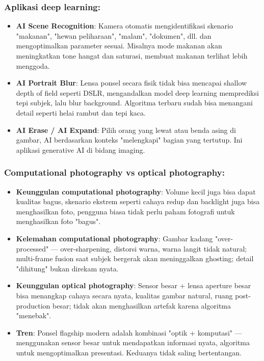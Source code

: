 \subsubsection*{Aplikasi deep learning:}

\begin{itemize}
  \item \textbf{AI Scene Recognition}: Kamera otomatis mengidentifikasi skenario "makanan", "hewan peliharaan", "malam", "dokumen", dll. dan mengoptimalkan parameter sesuai. Misalnya mode makanan akan meningkatkan tone hangat dan saturasi, membuat makanan terlihat lebih menggoda.
  \item \textbf{AI Portrait Blur}: Lensa ponsel secara fisik tidak bisa mencapai shallow depth of field seperti DSLR, mengandalkan model deep learning memprediksi tepi subjek, lalu blur background. Algoritma terbaru sudah bisa menangani detail seperti helai rambut dan tepi kaca.
  \item \textbf{AI Erase / AI Expand}: Pilih orang yang lewat atau benda asing di gambar, AI berdasarkan konteks "melengkapi" bagian yang tertutup. Ini aplikasi generative AI di bidang imaging.
\end{itemize}

\subsubsection*{Computational photography vs optical photography:}

\begin{itemize}
  \item \textbf{Keunggulan computational photography}: Volume kecil juga bisa dapat kualitas bagus, skenario ekstrem seperti cahaya redup dan backlight juga bisa menghasilkan foto, pengguna biasa tidak perlu paham fotografi untuk menghasilkan foto "bagus".
  \item \textbf{Kelemahan computational photography}: Gambar kadang "over-processed" — over-sharpening, distorsi warna, warna langit tidak natural; multi-frame fusion saat subjek bergerak akan meninggalkan ghosting; detail "dihitung" bukan direkam nyata.
  \item \textbf{Keunggulan optical photography}: Sensor besar + lensa aperture besar bisa menangkap cahaya secara nyata, kualitas gambar natural, ruang post-production besar; tidak akan menghasilkan artefak karena algoritma "menebak".
  \item \textbf{Tren}: Ponsel flagship modern adalah kombinasi "optik + komputasi" — menggunakan sensor besar untuk mendapatkan informasi nyata, algoritma untuk mengoptimalkan presentasi. Keduanya tidak saling bertentangan.
\end{itemize}

